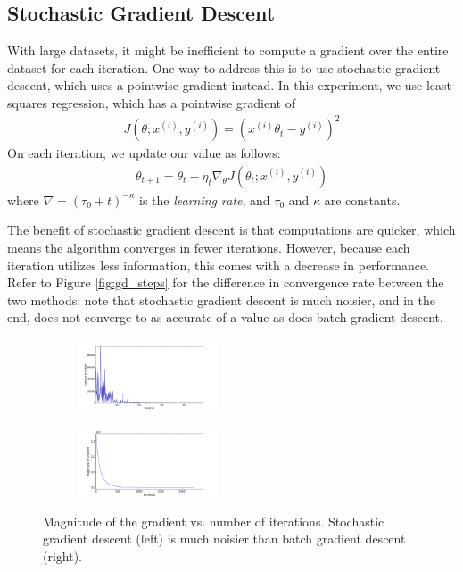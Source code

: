 \documentclass[10pt]{paper}
\begin{document}
\subsection{Stochastic Gradient Descent}

With large datasets, it might be inefficient to compute a gradient over the entire dataset for each iteration. One way to address this is to use stochastic gradient descent, which uses a pointwise gradient instead. In this experiment, we use least-squares regression, which has a pointwise gradient of 
\begin{align*}
J(\theta; x^{(i)}, y^{(i)}) = (x^{(i)}\theta_t - y^{(i)})^2
\end{align*}
On each iteration, we update our value as follows:
\begin{align*}
\theta_{t+1} = \theta_{t} - \eta_t \nabla_\theta J(\theta_t; x^{(i)}, y^{(i)})
\end{align*}
where $\nabla = (\tau_0 + t)^{-\kappa}$ is the \emph{learning rate}, and $\tau_0$ and $\kappa$ are constants.

The benefit of stochastic gradient descent is that computations are quicker, which means the algorithm converges in fewer iterations. However, because each iteration utilizes less information, this comes with a decrease in performance. Refer to Figure \ref{fig:gd_steps} for the difference in convergence rate between the two methods: note that stochastic gradient descent is much noisier, and in the end, does not converge to as accurate of a value as does batch gradient descent.

\begin{figure}[ht!]
  \center
  \label{fig:gd_steps}
  \begin{subfigure}
    \centering
      \includegraphics[width=0.45\textwidth]{../images/stochastic_gradient_steps}
  \end{subfigure}
  \begin{subfigure}
    \centering
      \includegraphics[width=0.45\textwidth]{../images/batch_gradient_steps_2}
  \end{subfigure}
  \caption{Magnitude of the gradient vs. number of iterations. Stochastic gradient descent (left) is much noisier than batch gradient descent (right).}
\end{figure}
\end{document}
